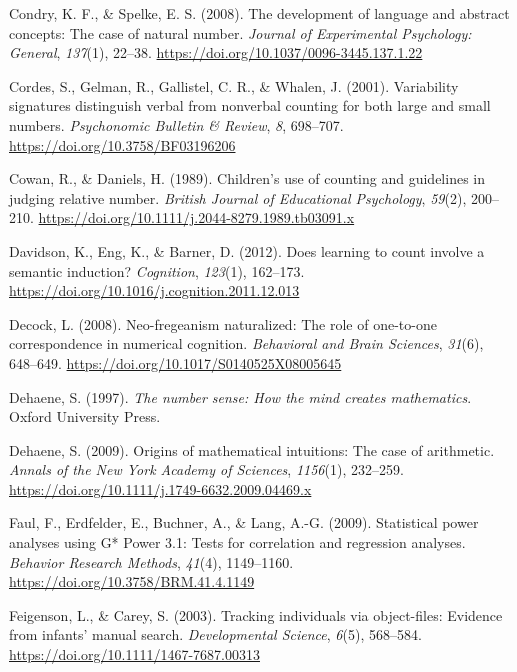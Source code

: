 \documentclass[
  man,floatsintext]{apa7}
\newlength{\cslhangindent}
\newlength{\cslentryspacingunit} %
\newenvironment{CSLReferences}[2] %
 {%
  \setlength{\parindent}{0pt}
  \ifodd #1
  \let\oldpar\par
  \def\par{\hangindent=\cslhangindent\oldpar}
  \fi
  \setlength{\parskip}{#2\cslentryspacingunit}
 }%
 {}
\begin{document}
\begin{CSLReferences}{1}{0}
\leavevmode{}%
Condry, K. F., \& Spelke, E. S. (2008). The development of language and abstract concepts: {The} case of natural number. \emph{Journal of Experimental Psychology: General}, \emph{137}(1), 22--38. \url{https://doi.org/10.1037/0096-3445.137.1.22}

\leavevmode{}%
Cordes, S., Gelman, R., Gallistel, C. R., \& Whalen, J. (2001). Variability signatures distinguish verbal from nonverbal counting for both large and small numbers. \emph{Psychonomic Bulletin \& Review}, \emph{8}, 698--707. \url{https://doi.org/10.3758/BF03196206}

\leavevmode{}%
Cowan, R., \& Daniels, H. (1989). Children's use of counting and guidelines in judging relative number. \emph{British Journal of Educational Psychology}, \emph{59}(2), 200--210. \url{https://doi.org/10.1111/j.2044-8279.1989.tb03091.x}

\leavevmode{}%
Davidson, K., Eng, K., \& Barner, D. (2012). Does learning to count involve a semantic induction? \emph{Cognition}, \emph{123}(1), 162--173. \url{https://doi.org/10.1016/j.cognition.2011.12.013}

\leavevmode{}%
Decock, L. (2008). Neo-fregeanism naturalized: The role of one-to-one correspondence in numerical cognition. \emph{Behavioral and Brain Sciences}, \emph{31}(6), 648--649. \url{https://doi.org/10.1017/S0140525X08005645}

\leavevmode{}%
Dehaene, S. (1997). \emph{The number sense: How the mind creates mathematics}. Oxford University Press.

\leavevmode{}%
Dehaene, S. (2009). Origins of mathematical intuitions: The case of arithmetic. \emph{Annals of the New York Academy of Sciences}, \emph{1156}(1), 232--259. \url{https://doi.org/10.1111/j.1749-6632.2009.04469.x}

\leavevmode{}%
Faul, F., Erdfelder, E., Buchner, A., \& Lang, A.-G. (2009). Statistical power analyses using {G* Power 3.1}: Tests for correlation and regression analyses. \emph{Behavior Research Methods}, \emph{41}(4), 1149--1160. \url{https://doi.org/10.3758/BRM.41.4.1149}

\leavevmode{}%
Feigenson, L., \& Carey, S. (2003). Tracking individuals via object-files: Evidence from infants' manual search. \emph{Developmental Science}, \emph{6}(5), 568--584. \url{https://doi.org/10.1111/1467-7687.00313}


\end{CSLReferences}
\end{document}
